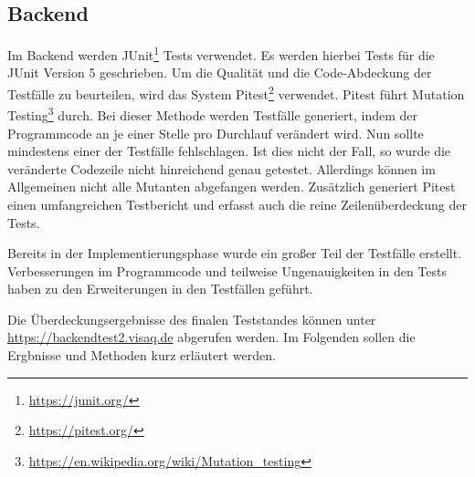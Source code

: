 \subsection{Backend}
Im Backend werden JUnit\footnote{\url{https://junit.org/}} Tests verwendet. Es werden hierbei Tests für die JUnit Version 5 geschrieben.
Um die Qualität und die Code-Abdeckung der Testfälle zu beurteilen, wird das System Pitest\footnote{\url{https://pitest.org/}} verwendet.
Pitest führt Mutation Testing\footnote{\url{https://en.wikipedia.org/wiki/Mutation_testing}} durch.
Bei dieser Methode werden Testfälle generiert, indem der Programmcode an je einer Stelle pro Durchlauf verändert wird.
Nun sollte mindestens einer der Testfälle fehlschlagen.
Ist dies nicht der Fall, so wurde die veränderte Codezeile nicht hinreichend genau getestet.
Allerdings können im Allgemeinen nicht alle Mutanten abgefangen werden.
Zusätzlich generiert Pitest einen umfangreichen Testbericht und erfasst auch die reine Zeilenüberdeckung der Tests.

Bereits in der Implementierungsphase wurde ein großer Teil der Testfälle erstellt.
Verbesserungen im Programmcode und teilweise Ungenauigkeiten in den Tests haben zu den Erweiterungen in den Testfällen geführt.

Die Überdeckungsergebnisse des finalen Teststandes können unter \url{https://backendtest2.visaq.de} abgerufen werden.
Im Folgenden sollen die Ergbnisse und Methoden kurz erläutert werden.


